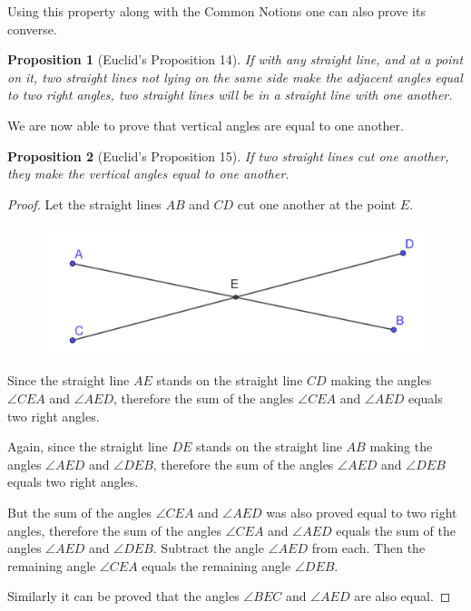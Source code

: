 \documentclass[
]{book}
\newtheorem{proposition}{Proposition}[chapter]
\theoremstyle{definition}
\theoremstyle{definition}
\theoremstyle{definition}
\theoremstyle{definition}
\theoremstyle{remark}
\begin{document}
Using this property along with the Common Notions one can also prove its converse.

\begin{proposition}[Euclid's Proposition 14]
\protect\hypertarget{prp:prop14}{}\label{prp:prop14}If with any straight line, and at a point on it, two straight lines not lying on the same side make the adjacent angles equal to two right angles, two straight lines will be in a straight line with one another.
\end{proposition}

We are now able to prove that vertical angles are equal to one another.

\begin{proposition}[Euclid's Proposition 15]
\protect\hypertarget{prp:prop15}{}\label{prp:prop15}If two straight lines cut one another, they make the vertical angles equal to one another.
\end{proposition}

\begin{proof}
Let the straight lines \(AB\) and \(CD\) cut one another at the point \(E\).

\begin{figure}

{\centering \includegraphics[width=0.5\linewidth]{images/Prop15} 

}

\end{figure}

Since the straight line \(AE\) stands on the straight line \(CD\) making the angles \(\angle CEA\) and \(\angle AED\), therefore the sum of the angles \(\angle CEA\) and \(\angle AED\) equals two right angles.

Again, since the straight line \(DE\) stands on the straight line \(AB\) making the angles \(\angle AED\) and \(\angle DEB\), therefore the sum of the angles \(\angle AED\) and \(\angle DEB\) equals two right angles.

But the sum of the angles \(\angle CEA\) and \(\angle AED\) was also proved equal to two right angles, therefore the sum of the angles \(\angle CEA\) and \(\angle AED\) equals the sum of the angles \(\angle AED\) and \(\angle DEB\). Subtract the angle \(\angle AED\) from each. Then the remaining angle \(\angle CEA\) equals the remaining angle \(\angle DEB\).

Similarly it can be proved that the angles \(\angle BEC\) and \(\angle AED\) are also equal.
\end{proof}
\end{document}
